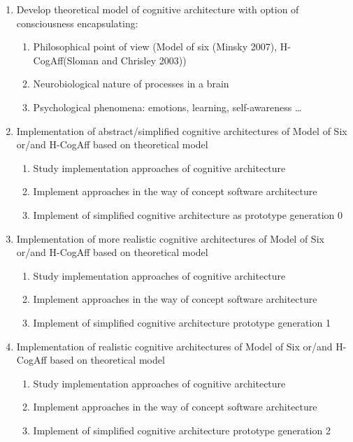 \begin{enumerate}
\def\labelenumi{\arabic{enumi}.}
\itemsep1pt\parskip0pt
\item
  Develop theoretical model of cognitive architecture with option of
  consciousness encapsulating:

  \begin{enumerate}
  \def\labelenumii{\arabic{enumii}.}
  \setcounter{enumii}{1}
  \itemsep1pt\parskip0pt
  \item
    Philosophical point of view (Model of six (Minsky 2007),
    H-CogAff(Sloman and Chrisley 2003))
  \item
    Neurobiological nature of processes in a brain
  \item
    Psychological phenomena: emotions, learning, self-awareness \ldots{}
  \end{enumerate}
\item
  Implementation of abstract/simplified cognitive architectures of Model
  of Six or/and H-CogAff based on theoretical model

  \begin{enumerate}
  \def\labelenumii{\arabic{enumii}.}
  \setcounter{enumii}{1}
  \itemsep1pt\parskip0pt
  \item
    Study implementation approaches of cognitive architecture
  \item
    Implement approaches in the way of concept software architecture
  \item
    Implement of simplified cognitive architecture as prototype
    generation 0
  \end{enumerate}
\item
  Implementation of more realistic cognitive architectures of Model of
  Six or/and H-CogAff based on theoretical model

  \begin{enumerate}
  \def\labelenumii{\arabic{enumii}.}
  \setcounter{enumii}{1}
  \itemsep1pt\parskip0pt
  \item
    Study implementation approaches of cognitive architecture
  \item
    Implement approaches in the way of concept software architecture
  \item
    Implement of simplified cognitive architecture prototype generation
    1
  \end{enumerate}
\item
  Implementation of realistic cognitive architectures of Model of Six
  or/and H-CogAff based on theoretical model

  \begin{enumerate}
  \def\labelenumii{\arabic{enumii}.}
  \setcounter{enumii}{1}
  \itemsep1pt\parskip0pt
  \item
    Study implementation approaches of cognitive architecture
  \item
    Implement approaches in the way of concept software architecture
  \item
    Implement of simplified cognitive architecture prototype generation
    2
  \end{enumerate}
\end{enumerate}

